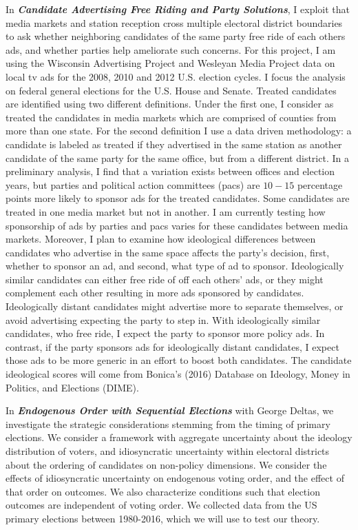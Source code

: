 \documentclass[12pt]{article}
\begin{document}
In \emph{\textbf{Candidate Advertising Free Riding and Party Solutions}},
I exploit that media markets and station reception cross multiple electoral district boundaries to ask
whether neighboring candidates of the same party free ride of each others ads,
and whether parties help ameliorate such concerns.
For this project, I am using the Wisconsin Advertising Project and Wesleyan Media Project data on local tv ads for the 2008, 2010 and 2012 U.S. election cycles.
I focus the analysis on federal general elections for the U.S. House and Senate.
Treated candidates are identified using two different definitions.
Under the first one, I consider as treated the candidates in media markets which are comprised of counties from more than one state.
For the second definition I use a data driven methodology: a candidate is labeled as treated if they advertised in the same station as another candidate of the same party for the same office, but from a different district.
In a preliminary analysis, I find that a variation exists between offices and election years, but parties and political action committees (pacs) are \(10-15\) percentage points more likely to sponsor ads for the treated candidates.
Some candidates are treated in one media market but not in another.
I am currently testing how sponsorship of ads by parties and pacs varies for these candidates between media markets.
Moreover, I plan to examine how ideological differences between candidates who advertise in the same space affects the party's decision, first, whether to sponsor an ad, and second, what type of ad to sponsor.
Ideologically similar candidates can either free ride of off each others' ads, or they might complement each other resulting in more ads sponsored by candidates.
Ideologically distant candidates might advertise more to separate themselves, or avoid advertising expecting the party to step in.
With ideologically similar candidates, who free ride, I expect the party to sponsor more policy ads.
In contrast, if the party sponsors ads for ideologically distant candidates, I expect those ads to be more generic in an effort to boost both candidates.
The candidate ideological scores will come from Bonica's (2016) Database on Ideology, Money in Politics, and Elections (DIME).

\vspace{0.15cm}


In \emph{\textbf{Endogenous Order with Sequential Elections}}  with George Deltas,
we investigate the strategic considerations stemming from the timing of primary elections.
We consider a framework with aggregate uncertainty about the ideology distribution of voters, and
idiosyncratic uncertainty within electoral districts about the ordering of candidates on non-policy dimensions.
We consider the effects of idiosyncratic uncertainty on endogenous voting order, and the effect of that order on outcomes.
We also characterize conditions such that election outcomes are independent of voting order.
We collected data from the US primary elections between 1980-2016, which we will use to test our theory.
\end{document}
